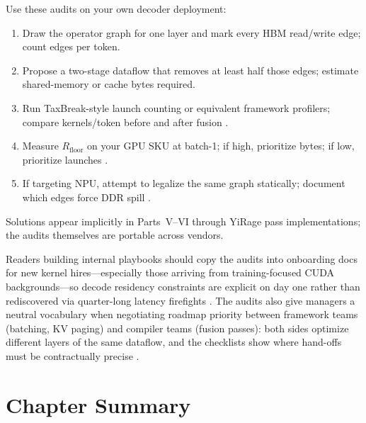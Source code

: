 Use these audits on your own decoder deployment:
\begin{enumerate}
\item Draw the operator graph for one layer and mark every HBM read/write edge; count edges per token.
\item Propose a two-stage dataflow that removes at least half those edges; estimate shared-memory or cache bytes required.
\item Run TaxBreak-style launch counting or equivalent framework profilers; compare kernels/token before and after fusion \citep{taxbreak2026}.
\item Measure $R_{\mathrm{floor}}$ on your GPU SKU at batch-1; if high, prioritize bytes; if low, prioritize launches \citep{memoryfloor2026}.
\item If targeting NPU, attempt to legalize the same graph statically; document which edges force DDR spill \citep{amd2024xdna}.
\end{enumerate}
Solutions appear implicitly in Parts~V--VI through YiRage pass implementations; the audits themselves are portable across vendors.

Readers building internal playbooks should copy the audits into onboarding docs for new kernel hires---especially those arriving from training-focused CUDA backgrounds---so decode residency constraints are explicit on day one rather than rediscovered via quarter-long latency firefights \citep{patel2025llminference,taxbreak2026}.
The audits also give managers a neutral vocabulary when negotiating roadmap priority between framework teams (batching, KV paging) and compiler teams (fusion passes): both sides optimize different layers of the same dataflow, and the checklists show where hand-offs must be contractually precise \citep{kwon2023vllm}.

\section{Chapter Summary}
\label{sec:ch02_summary}

